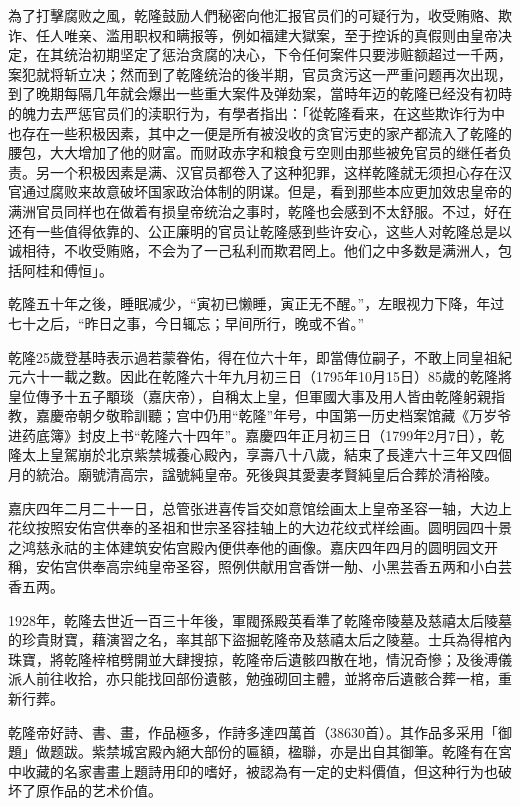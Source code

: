 為了打擊腐败之風，乾隆鼓励人們秘密向他汇报官员们的可疑行为，收受贿赂、欺诈、任人唯亲、滥用职权和瞒报等，例如福建大獄案，至于控诉的真假则由皇帝决定，在其统治初期坚定了惩治贪腐的决心，下令任何案件只要涉赃额超过一千两，案犯就将斩立决；然而到了乾隆统治的後半期，官员贪污这一严重问题再次出现，到了晚期每隔几年就会爆出一些重大案件及弹劾案，當時年迈的乾隆已经没有初時的魄力去严惩官员们的渎职行为，有學者指出：「從乾隆看来，在这些欺诈行为中也存在一些积极因素，其中之一便是所有被没收的贪官污吏的家产都流入了乾隆的腰包，大大增加了他的财富。而财政赤字和粮食亏空则由那些被免官员的继任者负责。另一个积极因素是满、汉官员都卷入了这种犯罪，这样乾隆就无须担心存在汉官通过腐败来故意破坏国家政治体制的阴谋。但是，看到那些本应更加效忠皇帝的满洲官员同样也在做着有损皇帝统治之事时，乾隆也会感到不太舒服。不过，好在还有一些值得依靠的、公正廉明的官员让乾隆感到些许安心，这些人对乾隆总是以诚相待，不收受贿赂，不会为了一己私利而欺君罔上。他们之中多数是满洲人，包括阿桂和傅恒」。

乾隆五十年之後，睡眠减少，“寅初已懒睡，寅正无不醒。”，左眼视力下降，年过七十之后，“昨日之事，今日辄忘；早间所行，晚或不省。”

乾隆25歲登基時表示過若蒙眷佑，得在位六十年，即當傳位嗣子，不敢上同皇祖紀元六十一載之數。因此在乾隆六十年九月初三日（1795年10月15日）85歲的乾隆將皇位傳予十五子顒琰（嘉庆帝），自稱太上皇，但軍國大事及用人皆由乾隆躬親指教，嘉慶帝朝夕敬聆訓聽；宫中仍用“乾隆”年号，中国第一历史档案馆藏《万岁爷进药底簿》封皮上书“乾隆六十四年”。嘉慶四年正月初三日（1799年2月7日），乾隆太上皇駕崩於北京紫禁城養心殿內，享壽八十八歲，結束了長達六十三年又四個月的統治。廟號清高宗，諡號純皇帝。死後與其愛妻孝賢純皇后合葬於清裕陵。

嘉庆四年二月二十一日，总管张进喜传旨交如意馆绘画太上皇帝圣容一轴，大边上花纹按照安佑宫供奉的圣祖和世宗圣容挂轴上的大边花纹式样绘画。圆明园四十景之鸿慈永祜的主体建筑安佑宫殿內便供奉他的画像。嘉庆四年四月的圆明园文开稱，安佑宫供奉高宗纯皇帝圣容，照例供献用宫香饼一觔、小黑芸香五两和小白芸香五两。

1928年，乾隆去世近一百三十年後，軍閥孫殿英看準了乾隆帝陵墓及慈禧太后陵墓的珍貴財寶，藉演習之名，率其部下盜掘乾隆帝及慈禧太后之陵墓。士兵為得棺內珠寶，將乾隆梓棺劈開並大肆搜掠，乾隆帝后遺骸四散在地，情況奇慘；及後溥儀派人前往收拾，亦只能找回部份遺骸，勉強砌回主體，並將帝后遺骸合葬一棺，重新行葬。

乾隆帝好詩、書、畫，作品極多，作詩多達四萬首（38630首）。其作品多采用「御題」做题跋。紫禁城宮殿內絕大部份的匾額，楹聯，亦是出自其御筆。乾隆有在宮中收藏的名家書畫上題詩用印的嗜好，被認為有一定的史料價值，但这种行为也破坏了原作品的艺术价值。

